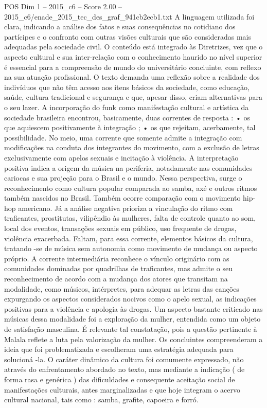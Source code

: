 \begin{textsample}{POS Dim 1 – 2015\_c6 – Score 2.00 – 2015\_c6/enade\_2015\_tec\_des\_graf\_941cb2ecb1.txt}
A linguagem utilizada foi clara, indicando a análise dos fatos e suas consequências no cotidiano dos partícipes e o confronto com outras visões culturais que são consideradas mais adequadas pela sociedade civil.
O conteúdo está integrado às Diretrizes, vez que o aspecto cultural e sua inter-relação com o conhecimento haurido no nível superior é essencial para a compreensão de mundo do universitário concluinte, com reflexo na sua atuação profissional.
O texto demanda uma reflexão sobre a realidade dos indivíduos que não têm acesso aos itens básicos da sociedade, como educação, saúde, cultura tradicional e segurança e que, apesar disso, criam alternativas para o seu lazer.
A incorporação do funk como manifestação cultural e artística da sociedade brasileira encontrou, basicamente, duas correntes de resposta : • os que aquiescem positivamente à integração ; • os que rejeitam, acerbamente, tal possibilidade.
No meio, uma corrente que somente admite a integração com modificações na conduta dos integrantes do movimento, com a exclusão de letras exclusivamente com apelos sexuais e incitação à violência.
A interpretação positiva indica a origem da música na periferia, notadamente nas comunidades cariocas e sua projeção para o Brasil e o mundo.
Nessa perspectiva, surge o reconhecimento como cultura popular comparada ao samba, axé e outros ritmos também nascidos no Brasil.
Também ocorre comparação com o movimento hip-hop americano.
Já a análise negativa prioriza a vinculação do ritmo com traficantes, prostitutas, vilipêndio às mulheres, falta de controle quanto ao som, local dos eventos, transações sexuais em público, uso frequente de drogas, violência exacerbada.
Faltam, para essa corrente, elementos básicos da cultura, tratando -se de música sem autonomia como movimento de mudança ou aspecto próprio.
A corrente intermediária reconhece o vínculo originário com as comunidades dominadas por quadrilhas de traficantes, mas admite o seu reconhecimento de acordo com a mudança dos atores que transitam na modalidade, como músicos, intérpretes, para adequar as letras das canções expurgando os aspectos considerados nocivos como o apelo sexual, as indicações positivas para a violência e apologia às drogas.
Um aspecto bastante criticado nas músicas dessa modalidade foi a exploração da mulher, entendida como um objeto de satisfação masculina.
É relevante tal constatação, pois a questão pertinente à Malala reflete a luta pela valorização da mulher.
Os concluintes compreenderam a ideia que foi problematizada e escolheram uma estratégia adequada para solucioná -la.
O caráter dinâmico da cultura foi comumente expressado, não através do enfrentamento abordado no texto, mas mediante a indicação ( de forma rasa e genérica ) das dificuldades e consequente aceitação social de manifestações culturais, antes marginalizadas e que hoje integram o acervo cultural nacional, tais como : samba, grafite, capoeira e forró.

\end{textsample}
